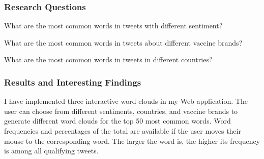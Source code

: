 \documentclass{article}
\begin{document}
\subsubsection{Research Questions}
What are the most common words in tweets with different sentiment?

What are the most common words in tweets about different vaccine brands?

What are the most common words in tweets in different countries?

\subsubsection{Results and Interesting Findings}

I have implemented three interactive word clouds in my Web application. The user can choose from different sentiments, countries, and vaccine brands to generate different word clouds for the top 50 most common words. Word frequencies and percentages of the total are available if the user moves their mouse to the corresponding word. The larger the word is, the higher its frequency is among all qualifying tweets.
\end{document}
